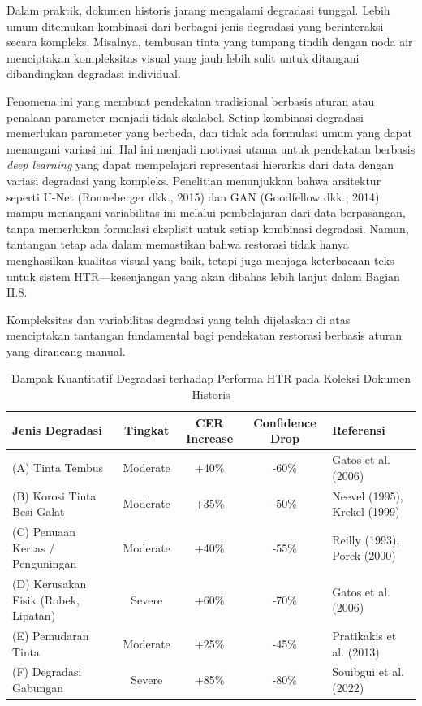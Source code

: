 \documentclass[12pt,a4paper]{article}
\begin{document}
\vspace{1.5ex}

Dalam praktik, dokumen historis jarang mengalami degradasi tunggal. Lebih umum ditemukan kombinasi dari berbagai jenis degradasi yang berinteraksi secara kompleks. Misalnya, tembusan tinta yang tumpang tindih dengan noda air menciptakan kompleksitas visual yang jauh lebih sulit untuk ditangani dibandingkan degradasi individual.

Fenomena ini yang membuat pendekatan tradisional berbasis aturan atau penalaan parameter menjadi tidak skalabel. Setiap kombinasi degradasi memerlukan parameter yang berbeda, dan tidak ada formulasi umum yang dapat menangani variasi ini. Hal ini menjadi motivasi utama untuk pendekatan berbasis \textit{deep learning} yang dapat mempelajari representasi hierarkis dari data dengan variasi degradasi yang kompleks. Penelitian menunjukkan bahwa arsitektur seperti U-Net (Ronneberger dkk., 2015) dan GAN (Goodfellow dkk., 2014) mampu menangani variabilitas ini melalui pembelajaran dari data berpasangan, tanpa memerlukan formulasi eksplisit untuk setiap kombinasi degradasi. Namun, tantangan tetap ada dalam memastikan bahwa restorasi tidak hanya menghasilkan kualitas visual yang baik, tetapi juga menjaga keterbacaan teks untuk sistem HTR—kesenjangan yang akan dibahas lebih lanjut dalam Bagian II.8.

\vspace{1.5ex}

Kompleksitas dan variabilitas degradasi yang telah dijelaskan di atas menciptakan tantangan fundamental bagi pendekatan restorasi berbasis aturan yang dirancang manual.

\begin{table}[H]
\centering
\caption{Dampak Kuantitatif Degradasi terhadap Performa HTR pada Koleksi Dokumen Historis}
\label{tab:degradation-impact}
\scriptsize
\begin{tabular}{|p{2.8cm}|c|c|c|p{2.5cm}|}
\hline
\textbf{Jenis Degradasi} & \textbf{Tingkat} & \textbf{CER Increase} & \textbf{Confidence Drop} & \textbf{Referensi} \\
\hline
(A) Tinta Tembus & Moderate & +40\% & -60\% & Gatos et al. (2006) \\
\hline
(B) Korosi Tinta Besi Galat & Moderate & +35\% & -50\% & Neevel (1995), Krekel (1999) \\
\hline
(C) Penuaan Kertas / Penguningan & Moderate & +40\% & -55\% & Reilly (1993), Porck (2000) \\
\hline
(D) Kerusakan Fisik (Robek, Lipatan) & Severe & +60\% & -70\% & Gatos et al. (2006) \\
\hline
(E) Pemudaran Tinta & Moderate & +25\% & -45\% & Pratikakis et al. (2013) \\
\hline
(F) Degradasi Gabungan & Severe & +85\% & -80\% & Souibgui et al. (2022) \\
\hline
\end{tabular}
\end{table}
\end{document}
